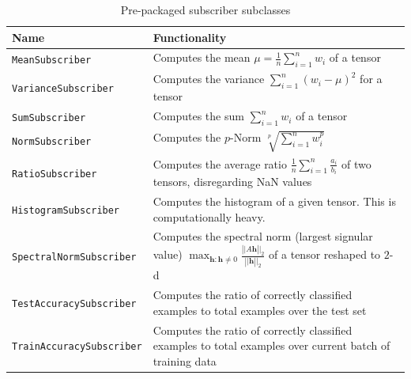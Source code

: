 \begin{table}
    \centering
    \caption{Pre-packaged subscriber subclasses}
    \label{tbl:subscribers}
    \begin{tabularx}{\textwidth}{lX}
        \toprule
        Name                             & Functionality                                                                                                                                                         \tabularnewline
        \midrule
        \texttt{MeanSubscriber}          & Computes the mean $\mu = \frac{1}{n}\sum_{i=1}^n w_i$ of a tensor                                                                                                     \tabularnewline
        \texttt{VarianceSubscriber}      & Computes the variance $\sum_{i=1}^n (w_i - \mu)^2$ for a tensor                                                                                                       \tabularnewline
        \texttt{SumSubscriber}           & Computes the sum $\sum_{i=1}^n w_i$ of a tensor                                                                                                                       \tabularnewline
        \texttt{NormSubscriber}          & Computes the $p$-Norm $\sqrt[p]{\sum_{i=1}^n w_i^p}$                                                                                                                  \tabularnewline
        \texttt{RatioSubscriber}         & Computes the average ratio $\frac{1}{n}\sum_{i=1}^n \frac{a_i}{b_i}$ of two tensors, disregarding NaN values                                                          \tabularnewline
        \texttt{HistogramSubscriber}     & Computes the histogram of a given tensor. This is computationally heavy.                                                                                              \tabularnewline
        \texttt{SpectralNormSubscriber}  & Computes the spectral norm (largest signular value) $\max_{\mathbf{h}:\mathbf{h}\neq 0} \frac{\left||A\mathbf{h}\right||_2}{\left||\mathbf{h}\right||_2}$ of a tensor reshaped to $2$-d \tabularnewline
        \texttt{TestAccuracySubscriber}  & Computes the ratio of correctly classified examples to total examples over the test set                                                                               \tabularnewline
        \texttt{TrainAccuracySubscriber} & Computes the ratio of correctly classified examples to total examples over current batch of training data                                                             \tabularnewline
        \bottomrule
    \end{tabularx}
\end{table}

